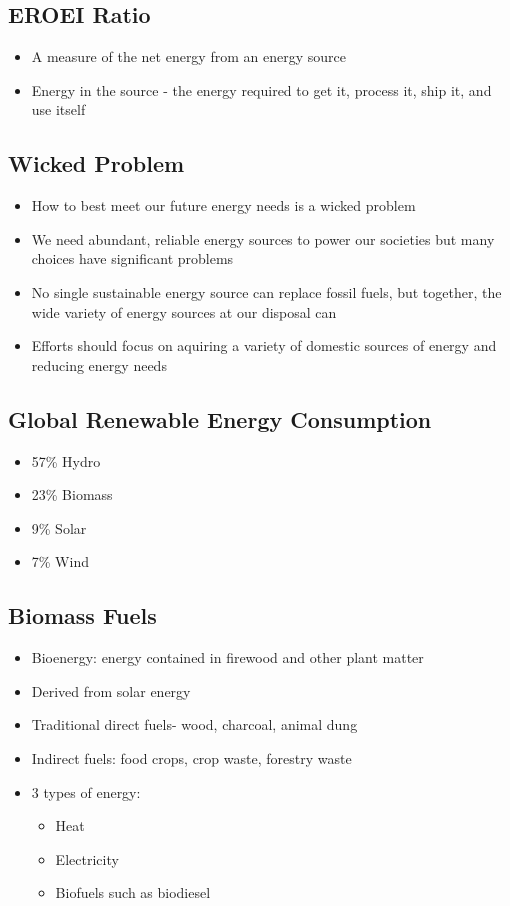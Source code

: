\documentclass[11pt]{article}
\begin{document}
\subsection{EROEI Ratio}
\label{sec:org8815d14}
\begin{itemize}
\item A measure of the net energy from an energy source
\item Energy in the source - the energy required to get it, process it, ship it, and use itself
\end{itemize}
\subsection{Wicked Problem}
\label{sec:org14c1ef7}
\begin{itemize}
\item How to best meet our future energy needs is a wicked problem
\item We need abundant, reliable energy sources to power our societies but many choices have significant problems
\item No single sustainable energy source can replace fossil fuels, but together, the wide variety of energy sources at our disposal can
\item Efforts should focus on aquiring a variety of domestic sources of energy and reducing energy needs
\end{itemize}
\subsection{Global Renewable Energy Consumption}
\label{sec:org2127f79}
\begin{itemize}
\item 57\% Hydro
\item 23\% Biomass
\item 9\% Solar
\item 7\% Wind
\end{itemize}
\subsection{Biomass Fuels}
\label{sec:org868df7c}
\begin{itemize}
\item Bioenergy: energy contained in firewood and other plant matter
\item Derived from solar energy
\item Traditional direct fuels- wood, charcoal, animal dung
\item Indirect fuels: food crops, crop waste, forestry waste
\item 3 types of energy:
\begin{itemize}
\item Heat
\item Electricity
\item Biofuels such as biodiesel
\end{itemize}
\end{itemize}
\end{document}
